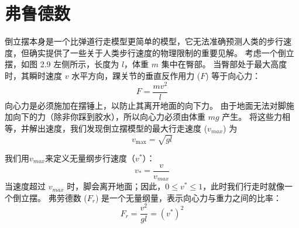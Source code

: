 \section{弗鲁德数}

倒立摆本身是一个比弹道行走模型更简单的模型，它无法准确预测人类的步行速度，但确实提供了一些关于人类步行速度的物理限制的重要见解。
考虑一个倒立摆，如图 2.9 左侧所示，长度为 $l$，体重 $m$ 集中在臀部。
当臀部处于最大高度时，其瞬时速度 $v$ 水平方向，踝关节的垂直反作用力 ($F$) 等于向心力：
%
\begin{equation}
	F = \frac{m v^2}{l}
\end{equation}
% 
向心力是必须施加在摆锤上，以防止其离开地面的向下力。
由于地面无法对脚施加向下的力（除非你踩到胶水），所以向心力必须由体重 $mg$ 产生。
将这些力相等，并解出速度，我们发现倒立摆模型的最大行走速度 ($v_{max}$) 为
%
\begin{equation}
	v_{\text{max}} = \sqrt{g l}
\end{equation}

我们用$v_{max}$来定义无量纲步行速度（$v^{*}$）：
\begin{equation}
	v_{*} = \frac{v}{v_{max}}
\end{equation}
%
当速度超过 $v_{max}$ 时，脚会离开地面；因此，$0 \leq v^{*} \leq 1$，此时我们行走时就像一个倒立摆。
弗劳德数 ($F_r$) 是一个无量纲量，表示向心力与重力之间的比率：
%
\begin{equation}
	F_r = \frac{v^2}{g l}
		= (v^{*})^2
\end{equation}













